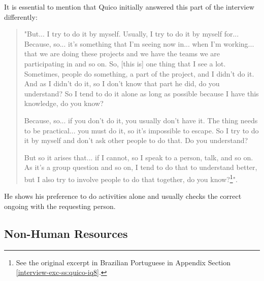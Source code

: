 It is essential to mention that Quico initially answered this part of the interview differently:
\begin{quote}
    "But... I try to do it by myself. Usually, I try to do it by myself for... Because, so... it's something that I'm seeing now in... when I'm working... that we are doing these projects and we have the teams we are participating in and so on. So, [this is] one thing that I see a lot. Sometimes, people do something, a part of the project, and I didn't do it. And as I didn't do it, so I don't know that part he did, do you understand? So I tend to do it alone as long as possible because I have this knowledge, do you know?

    Because, so... if you don't do it, you usually don't have it. The thing needs to be practical... you must do it, so it's impossible to escape. So I try to do it by myself and don't ask other people to do that. Do you understand?

    But so it arises that... if I cannot, so I speak to a person, talk, and so on. As it's a group question and so on, I tend to do that to understand better, but I also try to involve people to do that together, do you know?\footnote{See the original excerpt in Brazilian Portuguese in Appendix Section \ref{interview-exc-ss:quico-iq8}.}".    
\end{quote}
He shows his preference to do activities alone and usually checks the correct ongoing with the requesting person.

\subsection{Non-Human Resources}
\label{results-ss:non-human}

